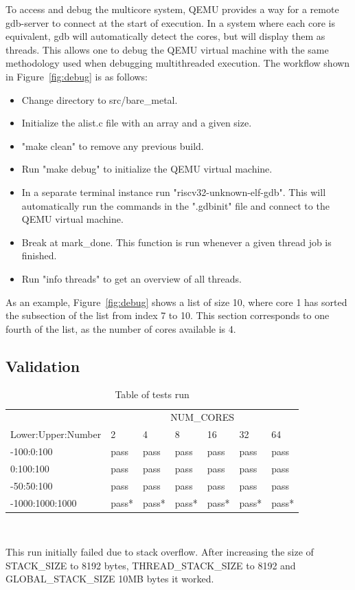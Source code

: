 To access and debug the multicore system, QEMU provides a way for a remote
gdb-server to connect at the start of execution.\cite{QEMU} In a system where
each core is equivalent, gdb will automatically detect the cores, but will
display them as threads. This allows one to debug the QEMU virtual machine with
the same methodology used when debugging multithreaded execution. The workflow
shown in Figure~\ref{fig:debug} is as follows:
\begin{itemize}
\item Change directory to src/bare\_metal.
\item Initialize the alist.c file with an array and a given size.
\item "make clean" to remove any previous build.
\item Run "make debug" to initialize the QEMU virtual machine.
\item In a separate terminal instance run "riscv32-unknown-elf-gdb". This will
  automatically run the commands in the ".gdbinit" file and connect to the QEMU
  virtual machine.
\item Break at mark\_done. This function is run whenever a given thread job is
  finished.
\item Run "info threads" to get an overview of all threads.
\end{itemize}
As an example, Figure~\ref{fig:debug} shows a list of size 10, where core 1 has
sorted the subsection of the list from index 7 to 10. This section corresponds
to one fourth of the list, as the number of cores available is 4.

\subsection{Validation}\label{sec:validate}
\begin{table}
  \caption{Table of tests run}\label{tab:tests}
  \begin{center}
    \begin{tabular}[c]{l|l|l|l|l|l|l}
      & \multicolumn{6}{c}{NUM\_CORES}\\
      \cline{2-7}
      Lower:Upper:Number & 2 & 4 & 8 & 16 & 32 & 64\\
      \hline
      -100:0:100 & pass & pass & pass & pass & pass & pass \\
      \hline
      0:100:100 & pass & pass & pass & pass & pass & pass\\
      \hline
      -50:50:100 & pass & pass & pass & pass & pass & pass \\
      \hline
      -1000:1000:1000 & pass* & pass* & pass* & pass* & pass* & pass*
    \end{tabular} \\
    \vspace{1em}
    \raggedright{\footnotesize *This run initially failed due to stack overflow. After
    increasing the size of STACK\_SIZE to 8192 bytes, THREAD\_STACK\_SIZE to
  8192 and GLOBAL\_STACK\_SIZE 10MB bytes it worked.} \\
  \end{center}
\end{table}

